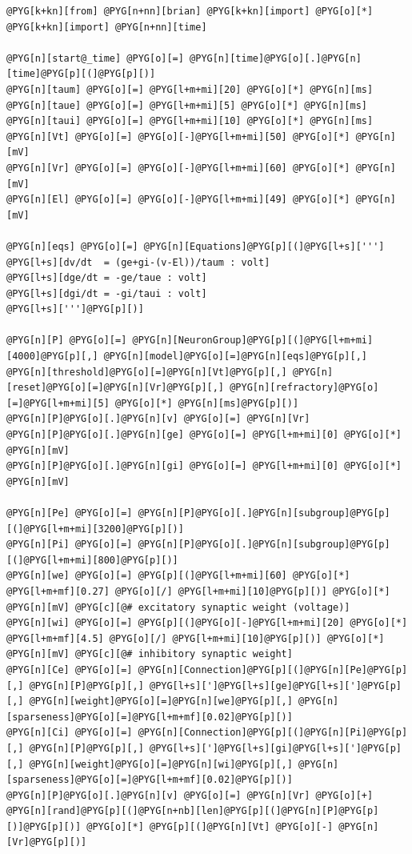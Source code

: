 \documentclass[letterpaper,10pt,english]{manual}
\begin{document}
\begin{Verbatim}[commandchars=@\[\]]
@PYG[k+kn][from] @PYG[n+nn][brian] @PYG[k+kn][import] @PYG[o][*]
@PYG[k+kn][import] @PYG[n+nn][time]

@PYG[n][start@_time] @PYG[o][=] @PYG[n][time]@PYG[o][.]@PYG[n][time]@PYG[p][(]@PYG[p][)]
@PYG[n][taum] @PYG[o][=] @PYG[l+m+mi][20] @PYG[o][*] @PYG[n][ms]
@PYG[n][taue] @PYG[o][=] @PYG[l+m+mi][5] @PYG[o][*] @PYG[n][ms]
@PYG[n][taui] @PYG[o][=] @PYG[l+m+mi][10] @PYG[o][*] @PYG[n][ms]
@PYG[n][Vt] @PYG[o][=] @PYG[o][-]@PYG[l+m+mi][50] @PYG[o][*] @PYG[n][mV]
@PYG[n][Vr] @PYG[o][=] @PYG[o][-]@PYG[l+m+mi][60] @PYG[o][*] @PYG[n][mV]
@PYG[n][El] @PYG[o][=] @PYG[o][-]@PYG[l+m+mi][49] @PYG[o][*] @PYG[n][mV]

@PYG[n][eqs] @PYG[o][=] @PYG[n][Equations]@PYG[p][(]@PYG[l+s][''']
@PYG[l+s][dv/dt  = (ge+gi-(v-El))/taum : volt]
@PYG[l+s][dge/dt = -ge/taue : volt]
@PYG[l+s][dgi/dt = -gi/taui : volt]
@PYG[l+s][''']@PYG[p][)]

@PYG[n][P] @PYG[o][=] @PYG[n][NeuronGroup]@PYG[p][(]@PYG[l+m+mi][4000]@PYG[p][,] @PYG[n][model]@PYG[o][=]@PYG[n][eqs]@PYG[p][,] @PYG[n][threshold]@PYG[o][=]@PYG[n][Vt]@PYG[p][,] @PYG[n][reset]@PYG[o][=]@PYG[n][Vr]@PYG[p][,] @PYG[n][refractory]@PYG[o][=]@PYG[l+m+mi][5] @PYG[o][*] @PYG[n][ms]@PYG[p][)]
@PYG[n][P]@PYG[o][.]@PYG[n][v] @PYG[o][=] @PYG[n][Vr]
@PYG[n][P]@PYG[o][.]@PYG[n][ge] @PYG[o][=] @PYG[l+m+mi][0] @PYG[o][*] @PYG[n][mV]
@PYG[n][P]@PYG[o][.]@PYG[n][gi] @PYG[o][=] @PYG[l+m+mi][0] @PYG[o][*] @PYG[n][mV]

@PYG[n][Pe] @PYG[o][=] @PYG[n][P]@PYG[o][.]@PYG[n][subgroup]@PYG[p][(]@PYG[l+m+mi][3200]@PYG[p][)]
@PYG[n][Pi] @PYG[o][=] @PYG[n][P]@PYG[o][.]@PYG[n][subgroup]@PYG[p][(]@PYG[l+m+mi][800]@PYG[p][)]
@PYG[n][we] @PYG[o][=] @PYG[p][(]@PYG[l+m+mi][60] @PYG[o][*] @PYG[l+m+mf][0.27] @PYG[o][/] @PYG[l+m+mi][10]@PYG[p][)] @PYG[o][*] @PYG[n][mV] @PYG[c][@# excitatory synaptic weight (voltage)]
@PYG[n][wi] @PYG[o][=] @PYG[p][(]@PYG[o][-]@PYG[l+m+mi][20] @PYG[o][*] @PYG[l+m+mf][4.5] @PYG[o][/] @PYG[l+m+mi][10]@PYG[p][)] @PYG[o][*] @PYG[n][mV] @PYG[c][@# inhibitory synaptic weight]
@PYG[n][Ce] @PYG[o][=] @PYG[n][Connection]@PYG[p][(]@PYG[n][Pe]@PYG[p][,] @PYG[n][P]@PYG[p][,] @PYG[l+s][']@PYG[l+s][ge]@PYG[l+s][']@PYG[p][,] @PYG[n][weight]@PYG[o][=]@PYG[n][we]@PYG[p][,] @PYG[n][sparseness]@PYG[o][=]@PYG[l+m+mf][0.02]@PYG[p][)]
@PYG[n][Ci] @PYG[o][=] @PYG[n][Connection]@PYG[p][(]@PYG[n][Pi]@PYG[p][,] @PYG[n][P]@PYG[p][,] @PYG[l+s][']@PYG[l+s][gi]@PYG[l+s][']@PYG[p][,] @PYG[n][weight]@PYG[o][=]@PYG[n][wi]@PYG[p][,] @PYG[n][sparseness]@PYG[o][=]@PYG[l+m+mf][0.02]@PYG[p][)]
@PYG[n][P]@PYG[o][.]@PYG[n][v] @PYG[o][=] @PYG[n][Vr] @PYG[o][+] @PYG[n][rand]@PYG[p][(]@PYG[n+nb][len]@PYG[p][(]@PYG[n][P]@PYG[p][)]@PYG[p][)] @PYG[o][*] @PYG[p][(]@PYG[n][Vt] @PYG[o][-] @PYG[n][Vr]@PYG[p][)]


\end{Verbatim}
\end{document}

